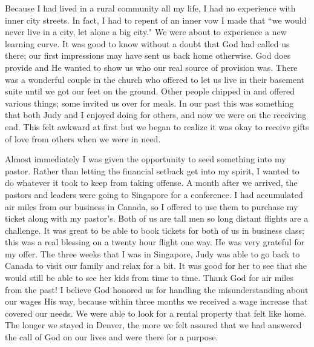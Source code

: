 \documentclass[oneside,12pt]{book}
\begin{document}
Because I had lived in a rural community all my life, I had no experience with inner city streets.  In fact, I had to repent of an inner vow I made that ``we would never live in a city, let alone a big city." We were about to experience a new learning curve. It was good to know without a doubt that God had called us there; our first impressions may have sent us back home otherwise. God does provide and He wanted to show us who our real source of provision was. There was a wonderful couple in the church who offered to let us live in their basement suite until we got our feet on the ground. Other people chipped in and offered various things; some invited us over for meals. In our past this was something that both Judy and I enjoyed doing for others, and now we were on the receiving end. This felt awkward at first but we began to realize it was okay to receive gifts of love from others when we were in need. 

Almost immediately I was given the opportunity to seed something into my pastor. Rather than letting the financial setback get into my spirit, I wanted to do whatever it took to keep from taking offense. A month after we arrived, the pastors and leaders were going to Singapore for a conference. I had accumulated air miles from our business in Canada, so I offered to use them to purchase my ticket along with my pastor's. Both of us are tall men so long distant flights are a challenge. It was great to be able to book tickets for both of us in business class; this was a real blessing on a twenty hour flight one way. He was very grateful for my offer. The three weeks that I was in Singapore, Judy was able to go back to Canada to visit our family and relax for a bit. It was good for her to see that she would still be able to see her kids from time to time. Thank God for air miles from the past! I believe God honored us for handling the misunderstanding about our wages His way, because within three months we received a wage increase that covered our needs. We were able to look for a rental property that felt like home. The longer we stayed in Denver, the more we felt assured that we had answered the call of God on our lives and were there for a purpose. 
\end{document}
